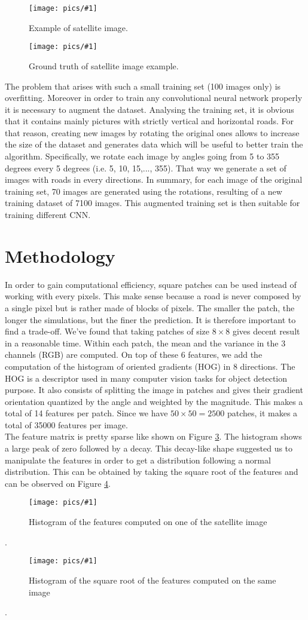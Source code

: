 \documentclass[10pt,conference,compsocconf]{IEEEtran}
\newcommand{\scalefig}[4]{
  \begin{figure}[ht!]
    \centering
    \texttt{[image: pics/\#1]}
 \caption{#3}
    \label{#4}
  \end{figure}}
\begin{document}
\scalefig{satImage}{0.8}{Example of satellite image.}{fig:satImage}
\scalefig{satImage_gt}{0.8}{Ground truth of satellite image example.}{fig:satImage}

The problem that arises with such a small training set (100 images only) is overfitting. Moreover in order to train any convolutional neural network properly it is necessary to augment the dataset. Analysing the training set, it is obvious that it contains mainly pictures with strictly vertical and horizontal roads. For that reason, creating new images by rotating the original ones allows to increase the size of the dataset and generates data which will be useful to better train the algorithm. Specifically, we rotate each image by angles going from 5 to 355 degrees every 5 degrees (i.e. 5, 10, 15,..., 355). That way we generate a set of images with roads in every directions. In summary, for each image of the original training set, 70 images are generated using the rotations, resulting of a new training dataset of 7100 images. This augmented training set is then suitable for training different CNN. \\


\section{Methodology}
In order to gain computational efficiency, square patches can be used instead of working with every pixels. This make sense because a road is never composed by a single pixel but is rather made of blocks of pixels. The smaller the patch, the longer the simulations, but the finer the prediction. It is therefore important to find a trade-off. We've found that taking patches of size $8 \times 8$ gives decent result in a reasonable time. Within each patch, the mean and the variance in the 3 channels (RGB) are computed. On top of these 6 features, we add  the computation of the histogram of oriented gradients (HOG) in 8 directions. The HOG is a descriptor used in many computer vision tasks for object detection purpose. It also consists of splitting the image in patches and gives their gradient orientation quantized by the angle and weighted by the magnitude. This makes a total of 14 features per patch. Since we have $50 \times 50 = 2500$ patches, it makes a total of 35000 features per image.\\

The feature matrix is pretty sparse like shown on Figure \ref{fig:hist_feats}. The histogram shows a large peak of zero followed by a decay. This decay-like shape suggested us to manipulate the features in order to get a distribution following a normal distribution. This can be obtained by taking the square root of the features and can be observed on Figure \ref{fig:hist_sqrt_feats}.
\scalefig{hist_feats}{1}{Histogram of the features computed on one of the satellite image}{fig:hist_feats}.\\
\scalefig{hist_sqrt_feats}{1}{Histogram of the square root of the features computed on the same image}{fig:hist_sqrt_feats}.\\
\end{document}
